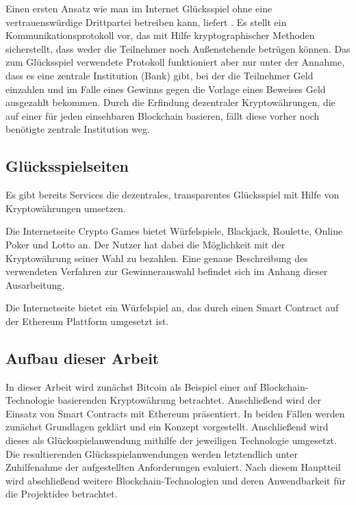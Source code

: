 Einen ersten Ansatz wie man im Internet Glücksspiel ohne eine vertrauenswürdige Drittpartei betreiben kann, liefert \cite{cyberdice_paper}. Es stellt ein Kommunikationsprotokoll vor, das mit Hilfe kryptographischer Methoden sicherstellt, dass weder die Teilnehmer noch Außenstehende betrügen können. Das zum Glücksspiel verwendete Protokoll funktioniert aber nur unter der Annahme, dass es eine zentrale Institution (Bank) gibt, bei der die Teilnehmer Geld einzahlen und im Falle eines Gewinns gegen die Vorlage eines Beweises Geld ausgezahlt bekommen.
\space
Durch die Erfindung dezentraler Kryptowährungen, die auf einer für jeden einsehbaren Blockchain basieren, fällt diese vorher noch benötigte zentrale Institution weg.


\subsection{Glücksspielseiten}
Es gibt bereits Services die dezentrales, transparentes Glücksspiel mit Hilfe von Kryptowährungen umsetzen.

Die Internetseite Crypto Games \cite{crypto_games} bietet Würfelspiele, Blackjack, Roulette, Online Poker und Lotto an. Der Nutzer hat dabei die Möglichkeit mit der Kryptowährung seiner Wahl zu bezahlen. Eine genaue Beschreibung des verwendeten Verfahren zur Gewinnerauswahl befindet sich im Anhang dieser Ausarbeitung.

Die Internetseite \cite{vdice} bietet ein Würfelspiel an, das durch einen Smart Contract auf der Ethereum Plattform umgesetzt ist.

\subsection{Aufbau dieser Arbeit}
In dieser Arbeit wird zunächst Bitcoin als Beispiel einer auf Blockchain-Technologie basierenden Kryptowährung betrachtet. Anschließend wird der Einsatz von Smart Contracts mit Ethereum präsentiert. In beiden Fällen werden zunächst Grundlagen geklärt und ein Konzept vorgestellt. Anschließend wird dieses als Glücksspielanwendung mithilfe der jeweiligen Technologie umgesetzt. Die resultierenden Glücksspielanwendungen werden letztendlich unter Zuhilfenahme der aufgestellten Anforderungen evaluiert. Nach diesem Hauptteil wird abschließend weitere Blockchain-Technologien und deren Anwendbarkeit für die Projektidee betrachtet.